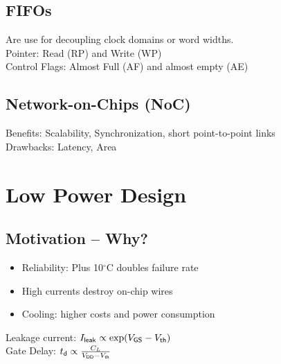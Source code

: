 \begin{sectionbox}
	\subsection{FIFOs}
	Are use for decoupling clock domains or word widths.\\
	Pointer: Read (RP) and Write (WP)\\
	Control Flags: Almost Full (AF) and almost empty (AE)

\end{sectionbox}

\begin{sectionbox}
	\subsection{Network-on-Chips (NoC)}
	Benefits: Scalability, Synchronization, short point-to-point links\\
	Drawbacks: Latency, Area
\end{sectionbox}

\section{Low Power Design}


\begin{sectionbox}
	\subsection{Motivation -- Why?}
	\begin{itemize}
		\item Reliability: Plus 10$^\circ$C doubles failure rate
		\item High currents destroy on-chip wires
		\item Cooling: higher costs and power consumption
	\end{itemize}
	
	Leakage current: $I_{\sf leak} \propto \exp(V_{\sf GS} - V_{\sf th})$\\
	Gate Delay: $t_{\sf d} \propto \frac{C_L}{V_{\sf DD} - V_{\sf th}}$
\end{sectionbox}


